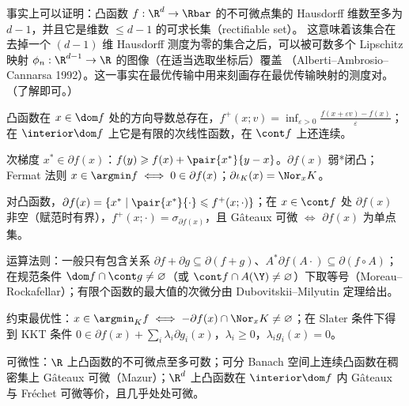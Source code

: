 \begin{remark}
\label{rem:21}
事实上可以证明：凸函数 $f:\R^d\to\Rbar$ 的不可微点集的 Hausdorff 维数至多为 $d-1$，并且它是维数 $\leqslant d-1$ 的可求长集（rectifiable set）。
这意味着该集合在去掉一个 $(d-1)$ 维 Hausdorff 测度为零的集合之后，可以被可数多个 Lipschitz 映射 $\phi_n:\R^{d-1}\to\R$ 的图像（在适当选取坐标后）覆盖
（Alberti--Ambrosio--Cannarsa 1992）。这一事实在最优传输中用来刻画存在最优传输映射的测度对。（了解即可。）
\end{remark}

\begin{keypoints}
  \item 凸函数在 $x\in\dom f$ 处的方向导数总存在，$f^+(x;v)=\inf_{\varepsilon>0}\frac{f(x+\varepsilon v)-f(x)}{\varepsilon}$；在 $\interior\dom f$ 上它是有限的次线性函数，在 $\cont f$ 上还连续。
  \item 次梯度 $x^*\in\partial f(x)$：$f(y)\geqslant f(x)+\pair{x^*}{y-x}$。$\partial f(x)$ 弱*闭凸；Fermat 法则 $x\in\argmin f\iff0\in\partial f(x)$；$\partial\iota_K(x)=\Nor_xK$。
  \item 对凸函数，$\partial f(x)=\{x^*\mid\pair{x^*}{\cdot}\leqslant f^+(x;\cdot)\}$；在 $x\in\cont f$ 处 $\partial f(x)$ 非空（赋范时有界），$f^+(x;\cdot)=\sigma_{\partial f(x)}$，且 Gâteaux 可微 $\iff$ $\partial f(x)$ 为单点集。
  \item 运算法则：一般只有包含关系 $\partial f+\partial g\subseteq\partial(f+g)$、$A^*\partial f(A\cdot)\subseteq\partial(f\circ A)$；在规范条件 $\dom f\cap\cont g\neq\varnothing$（或 $\cont f\cap A(\Y)\neq\varnothing$）下取等号（Moreau--Rockafellar）；有限个函数的最大值的次微分由 Dubovitskii--Milyutin 定理给出。
  \item 约束最优性：$x\in\argmin_Kf\iff-\partial f(x)\cap\Nor_xK\neq\varnothing$；在 Slater 条件下得到 KKT 条件 $0\in\partial f(x)+\sum_i\lambda_i\partial g_i(x)$，$\lambda_i\geqslant0$，$\lambda_ig_i(x)=0$。
  \item 可微性：$\R$ 上凸函数的不可微点至多可数；可分 Banach 空间上连续凸函数在稠密集上 Gâteaux 可微（Mazur）；$\R^d$ 上凸函数在 $\interior\dom f$ 内 Gâteaux 与 Fréchet 可微等价，且几乎处处可微。
\end{keypoints}
